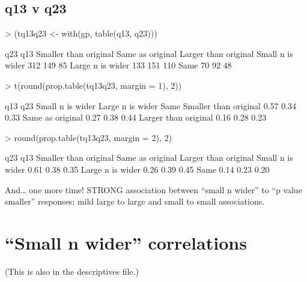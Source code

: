 \documentclass[11pt]{article}
\begin{document}
\subsection{q13 v q23}
\label{sec-4-1}
\begin{Schunk}
\begin{Sinput}
> (tq13q23 <- with(gp, table(q13, q23)))
\end{Sinput}
\begin{Soutput}
                  q23
q13                Smaller than original Same as original Larger than original
  Small n is wider                   312              149                   85
  Large n is wider                   133              151                  110
  Same                                70               92                   48
\end{Soutput}
\begin{Sinput}
> t(round(prop.table(tq13q23, margin = 1), 2))
\end{Sinput}
\begin{Soutput}
                       q13
q23                     Small n is wider Large n is wider Same
  Smaller than original             0.57             0.34 0.33
  Same as original                  0.27             0.38 0.44
  Larger than original              0.16             0.28 0.23
\end{Soutput}
\begin{Sinput}
> round(prop.table(tq13q23, margin = 2), 2)
\end{Sinput}
\begin{Soutput}
                  q23
q13                Smaller than original Same as original Larger than original
  Small n is wider                  0.61             0.38                 0.35
  Large n is wider                  0.26             0.39                 0.45
  Same                              0.14             0.23                 0.20
\end{Soutput}
\end{Schunk}





And\ldots{} one more time! STRONG association between ``small n wider'' to ``p value smaller'' responses; mild large to large and small to small associations.

\section{``Small n wider'' correlations}
\label{sec-5}
(This is also in the descriptives file.)
\end{document}
